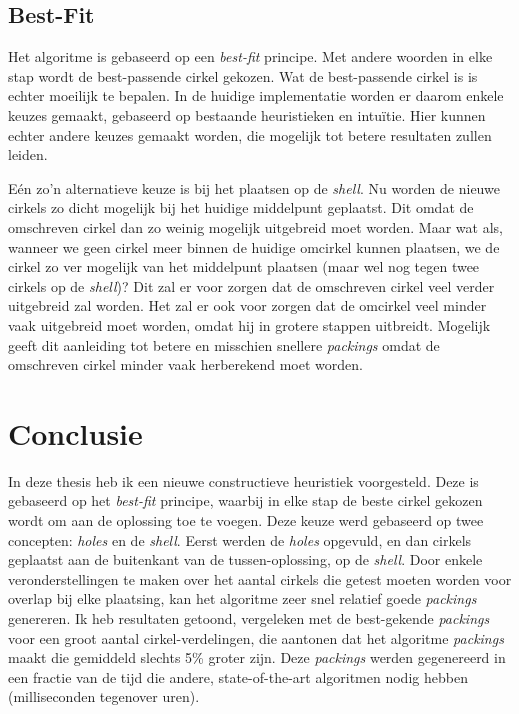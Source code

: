 \documentclass[12pt,a4paper,oneside]{book}
\begin{document}
\section{Best-Fit}

Het algoritme is gebaseerd op een \textit{best-fit} principe.
Met andere woorden in elke stap wordt de best-passende cirkel gekozen.
Wat de best-passende cirkel is is echter moeilijk te bepalen.
In de huidige implementatie worden er daarom enkele keuzes gemaakt, gebaseerd op bestaande heuristieken en intuïtie.
Hier kunnen echter andere keuzes gemaakt worden, die mogelijk tot betere resultaten zullen leiden.

Eén zo'n alternatieve keuze is bij het plaatsen op de \textit{shell}.
Nu worden de nieuwe cirkels zo dicht mogelijk bij het huidige middelpunt geplaatst.
Dit omdat de omschreven cirkel dan zo weinig mogelijk uitgebreid moet worden.
Maar wat als, wanneer we geen cirkel meer binnen de huidige omcirkel kunnen plaatsen, we de cirkel zo ver mogelijk van het middelpunt plaatsen (maar wel nog tegen twee cirkels op de \textit{shell})?
Dit zal er voor zorgen dat de omschreven cirkel veel verder uitgebreid zal worden.
Het zal er ook voor zorgen dat de omcirkel veel minder vaak uitgebreid moet worden, omdat hij in grotere stappen uitbreidt.
Mogelijk geeft dit aanleiding tot betere en misschien snellere \textit{packings} omdat de omschreven cirkel minder vaak herberekend moet worden.

\chapter{Conclusie} \label{chap:conclusie}

In deze thesis heb ik een nieuwe constructieve heuristiek voorgesteld.
Deze is gebaseerd op het \textit{best-fit} principe, waarbij in elke stap de beste cirkel gekozen wordt om aan de oplossing toe te voegen.
Deze keuze werd gebaseerd op twee concepten: \textit{holes} en de \textit{shell}.
Eerst werden de \textit{holes} opgevuld, en dan cirkels geplaatst aan de buitenkant van de tussen-oplossing, op de \textit{shell}.
Door enkele veronderstellingen te maken over het aantal cirkels die getest moeten worden voor overlap bij elke plaatsing, kan het algoritme zeer snel relatief goede \textit{packings} genereren.
Ik heb resultaten getoond, vergeleken met de best-gekende \textit{packings} voor een groot aantal cirkel-verdelingen, die aantonen dat het algoritme \textit{packings} maakt die gemiddeld slechts 5\% groter zijn.
Deze \textit{packings} werden gegenereerd in een fractie van de tijd die andere, state-of-the-art algoritmen nodig hebben (milliseconden tegenover uren).
\end{document}
